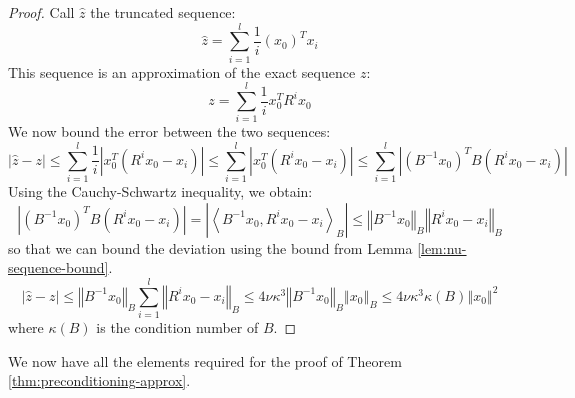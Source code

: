 \begin{proof}

Call $\hat{z}$ the truncated sequence: 
\[
\hat{z}=\sum_{i=1}^{l}\frac{1}{i}\left(x_{0}\right)^{T}x_{i}
\]
This sequence is an approximation of the exact sequence $z$: 
\[
z=\sum_{i=1}^{l}\frac{1}{i}x_{0}^{T}R^{i}x_{0}
\]
We now bound the error between the two sequences: 
\[
\left|\hat{z}-z\right|\leq\sum_{i=1}^{l}\frac{1}{i}\left|x_{0}^{T}\left(R^{i}x_{0}-x_{i}\right)\right|\leq\sum_{i=1}^{l}\left|x_{0}^{T}\left(R^{i}x_{0}-x_{i}\right)\right|\leq\sum_{i=1}^{l}\left|\left(B^{-1}x_{0}\right)^{T}B\left(R^{i}x_{0}-x_{i}\right)\right|
\]
Using the Cauchy-Schwartz inequality, we obtain: 
\[
\left|\left(B^{-1}x_{0}\right)^{T}B\left(R^{i}x_{0}-x_{i}\right)\right|=\left|\left\langle B^{-1}x_{0},R^{i}x_{0}-x_{i}\right\rangle _{B}\right|\leq\left\Vert B^{-1}x_{0}\right\Vert _{B}\left\Vert R^{i}x_{0}-x_{i}\right\Vert _{B}
\]
so that we can bound the deviation using the bound from Lemma \ref{lem:nu-sequence-bound}.
\[
\left|\hat{z}-z\right|\leq\left\Vert B^{-1}x_{0}\right\Vert _{B}\sum_{i=1}^{l}\left\Vert R^{i}x_{0}-x_{i}\right\Vert _{B}\leq4\nu\kappa^{3}\left\Vert B^{-1}x_{0}\right\Vert _{B}\left\Vert x_{0}\right\Vert _{B}\leq4\nu\kappa^{3}\kappa\left(B\right)\left\Vert x_{0}\right\Vert ^{2}
\]
where $\kappa\left(B\right)$ is the condition number of $B$. \end{proof}

We now have all the elements required for the proof of Theorem \ref{thm:preconditioning-approx}.


